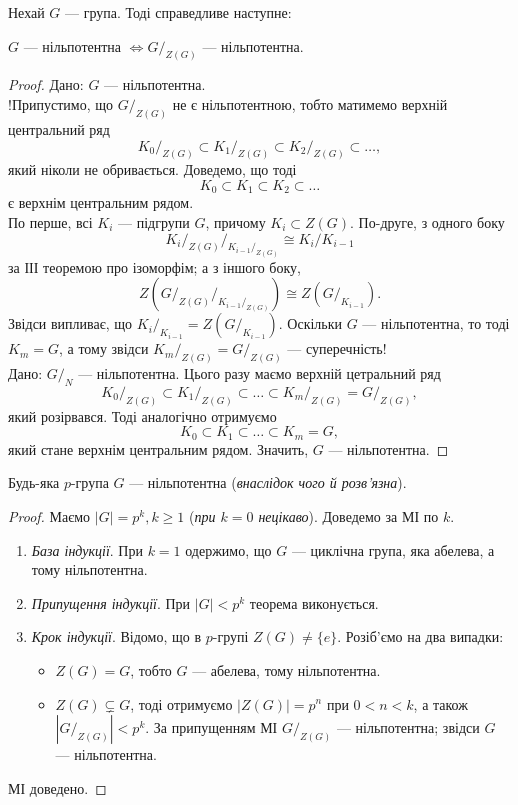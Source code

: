 \documentclass{math_library}
\begin{document}
\begin{proposition}
Нехай $G$ --- група. Тоді справедливе наступне:
\begin{center}
$G$ --- нільпотентна $\iff G/_{Z(G)}$ --- нільпотентна.
\end{center}
\end{proposition}

\begin{proof}
\rightproof Дано: $G$ --- нільпотентна.\\
!Припустимо, що $G/_{Z(G)}$ не є нільпотентною, тобто матимемо верхній центральний ряд 
\[
{K_0}/_{Z(G)} \subset {K_1}/_{Z(G)} \subset {K_2}/_{Z(G)} \subset \dots,
\]
який ніколи не обривається. Доведемо, що тоді 
\[
K_0 \subset K_1 \subset K_2 \subset \dots
\]
є верхнім центральним рядом.\\
По перше, всі $K_i$ --- підгрупи $G$, причому $K_i \subset Z(G)$. По-друге, з одного боку 
\[
{{K_i}/_{Z(G)}}/_{{K_{i-1}}/_{Z(G)}} \cong {K_i}/K_{i-1}
\]
за ІІІ теоремою про ізоморфім; а з іншого боку, 
\[
Z\left( {G/_{Z(G)}}/_{{K_{i-1}}/_{Z(G)}} \right) \cong Z(G/_{K_{i-1}}).
\]
Звідси випливає, що ${K_i}/_{K_{i-1}} = Z(G/_{K_{i-1}})$. Оскільки $G$ --- нільпотентна, то тоді $K_m = G$, а тому звідси ${K_m}/_{Z(G)} = G/_{Z(G)}$ --- суперечність!
\bigskip \\
\leftproof Дано: $G/_N$ --- нільпотентна. Цього разу маємо верхній цетральний ряд 
\[
{K_0}/_{Z(G)} \subset {K_1}/_{Z(G)} \subset \dots \subset {K_m}/_{Z(G)} = {G}/_{Z(G)},
\]
який розірвався. Тоді аналогічно отримуємо 
\[
K_0 \subset K_1 \subset \dots \subset K_m = G,
\]
який стане верхнім центральним рядом. Значить, $G$ --- нільпотентна.
\end{proof}

\begin{theorem}
Будь-яка $p$-група $G$ --- нільпотентна (\textit{внаслідок чого й розв'язна}).
\end{theorem}

\begin{proof}
Маємо $|G| = p^k, k \geq 1$ (\textit{при $k = 0$ нецікаво}). Доведемо за МІ по $k$.
\begin{enumerate}[nosep,wide=0pt,label={\Roman*.}]
\item \textit{База індукції}. При $k = 1$ одержимо, що $G$ --- циклічна група, яка абелева, а тому нільпотентна.
\item \textit{Припущення індукції}. При $|G| < p^k$ теорема виконується.
\item \textit{Крок індукції}. Відомо, що в $p$-групі $Z(G) \neq \{e\}$. Розіб'ємо на два випадки:
\begin{itemize}[nosep,wide=0pt]
\item $Z(G) = G$, тобто $G$ --- абелева, тому нільпотентна.
\item $Z(G) \subsetneq G$, тоді отримуємо $|Z(G)| = p^n$ при $0 < n < k$, а також $|G/_{Z(G)}| < p^k$. За припущенням МІ $G/_{Z(G)}$ --- нільпотентна; звідси $G$ --- нільпотентна.
\end{itemize}
\end{enumerate}
МІ доведено.
\end{proof}
\newpage
\end{document}
